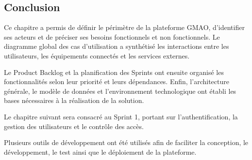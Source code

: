 \subsection*{Conclusion}

Ce chapitre a permis de définir le périmètre de la plateforme GMAO, d’identifier ses acteurs et de préciser ses besoins fonctionnels et non fonctionnels. Le diagramme global des cas d’utilisation a synthétisé les interactions entre les utilisateurs, les équipements connectés et les services externes.

Le Product Backlog et la planification des Sprints ont ensuite organisé les fonctionnalités selon leur priorité et leurs dépendances. Enfin, l’architecture générale, le modèle de données et l’environnement technologique ont établi les bases nécessaires à la réalisation de la solution.

Le chapitre suivant sera consacré au Sprint 1, portant sur l’authentification, la gestion des utilisateurs et le contrôle des accès.

\iffalse

Plusieurs outils de développement ont été utilisés afin de faciliter la conception, le développement, le test ainsi que le déploiement de la plateforme.


